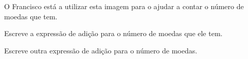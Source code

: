 \begin{question}
\begin{instance}
\begin{statement}
O Francisco está a utilizar esta imagem para o ajudar a contar o número de moedas que tem.\par
{}
\end{statement}
\begin{mcq}[standalone=false,no-label=true]
\begin{stem}
Escreve a expressão de adição para o número de moedas que ele tem.\par

\end{stem}
\begin{distractors}

\end{distractors}

\end{mcq}
\begin{mcq}[standalone=false,no-label=true]
\begin{stem}
Escreve outra expressão de adição para o número de moedas.\par

\end{stem}
\begin{distractors}

\end{distractors}

\end{mcq}

\end{instance}

\end{question}
